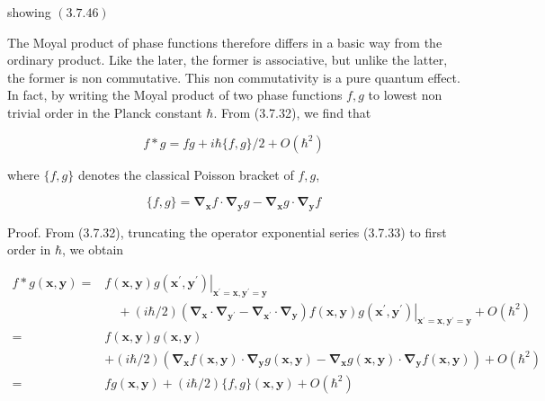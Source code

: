 \documentclass{article}
\begin{document}
showing $(3.7 .46)$

The Moyal product of phase functions therefore differs in a basic way from the
ordinary product. Like the later, the former is associative, but unlike the latter, the former is non commutative. This non commutativity is a pure quantum effect. In fact, by writing the Moyal product of two phase functions $f, g$ to lowest non trivial order in the Planck constant $\hbar$. From (3.7.32), we find that
 
\begin{equation*}
f * g=f g+i \hbar\{f, g\} / 2+O\left(\hbar^{2}\right) \tag{3.7.48}
\end{equation*}
 
where $\{f, g\}$ denotes the classical Poisson bracket of $f, g$,
 
\begin{equation*}
\{f, g\}=\boldsymbol{\nabla}_{\boldsymbol{x}} f \cdot \boldsymbol{\nabla}_{\boldsymbol{y}} g-\boldsymbol{\nabla}_{\boldsymbol{x}} g \cdot \boldsymbol{\nabla}_{\boldsymbol{y}} f \tag{3.7.49}
\end{equation*}
 

Proof. From (3.7.32), truncating the operator exponential series (3.7.33) to first order in $\hbar$, we obtain
 
\begin{align*}
f * g(\boldsymbol{x}, \boldsymbol{y})= & \left.f(\boldsymbol{x}, \boldsymbol{y}) g\left(\boldsymbol{x}^{\prime}, \boldsymbol{y}^{\prime}\right)\right|_{\boldsymbol{x}^{\prime}=\boldsymbol{x}, \boldsymbol{y}^{\prime}=\boldsymbol{y}}  \tag{3.7.50}\\
& \quad+\left.(i \hbar / 2)\left(\boldsymbol{\nabla}_{\boldsymbol{x}} \cdot \boldsymbol{\nabla}_{\boldsymbol{y}^{\prime}}-\boldsymbol{\nabla}_{\boldsymbol{x}^{\prime}} \cdot \boldsymbol{\nabla}_{\boldsymbol{y}}\right) f(\boldsymbol{x}, \boldsymbol{y}) g\left(\boldsymbol{x}^{\prime}, \boldsymbol{y}^{\prime}\right)\right|_{\boldsymbol{x}^{\prime}=\boldsymbol{x}, \boldsymbol{y}^{\prime}=\boldsymbol{y}}+O\left(\hbar^{2}\right) \\
= & f(\boldsymbol{x}, \boldsymbol{y}) g(\boldsymbol{x}, \boldsymbol{y}) \\
& +(i \hbar / 2)\left(\boldsymbol{\nabla}_{\boldsymbol{x}} f(\boldsymbol{x}, \boldsymbol{y}) \cdot \boldsymbol{\nabla}_{\boldsymbol{y}} g(\boldsymbol{x}, \boldsymbol{y})-\boldsymbol{\nabla}_{\boldsymbol{x}} g(\boldsymbol{x}, \boldsymbol{y}) \cdot \boldsymbol{\nabla}_{\boldsymbol{y}} f(\boldsymbol{x}, \boldsymbol{y})\right)+O\left(\hbar^{2}\right) \\
= & f g(\boldsymbol{x}, \boldsymbol{y})+(i \hbar / 2)\{f, g\}(\boldsymbol{x}, \boldsymbol{y})+O\left(\hbar^{2}\right)
\end{align*}
 
\end{document}
